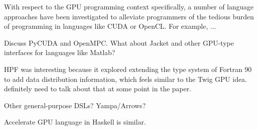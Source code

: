 With respect to the GPU programming context specifically, a number of language
approaches have been investigated to alleviate programmers of the tedious burden
of programming in languages like CUDA or OpenCL.  For example, ...


Discuss PyCUDA and OpenMPC. What about Jacket and other GPU-type interfaces
for languages like Matlab?

HPF was interesting because it explored extending the type system of Fortran
90 to add data distribution information, which feels similar to the Twig GPU
idea. definitely need to talk about that at some point in the paper.

Other general-purpose DSLs? Yampa/Arrows?

Accelerate GPU language in Haskell is similar.  
